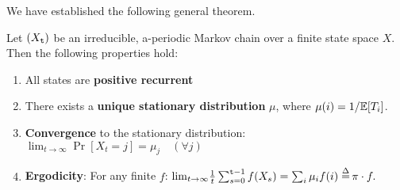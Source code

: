 We have established the following general theorem.

\begin{theorem}\label{thm:finite_Markov_chains}
Let $({X_{\tt t}})$ be an irreducible,  a-periodic Markov chain over
a finite state space $X$.  Then the following properties hold:
\begin{enumerate}
\item All states are \textbf{positive recurrent}
\item There exists a \textbf{unique stationary distribution}
${\mu}$, where $\mu(i)=1/\mathbb{E}[T_i]$.
\item \textbf{Convergence} to the stationary distribution: 
${\lim _{t \to \infty }}\Pr
[X_t=j] = {\mu_j}\quad (\forall j)$
\item \textbf{Ergodicity}: For any finite $f$: ${\lim _{t \to \infty }}\frac{1}{t}\sum\nolimits_{s = 0}^{\ttime - 1} {f({X_s}) = \sum\nolimits_i {\mu_i f(i) \buildrel \Delta \over = } } \,\pi  \cdot f.$
\end{enumerate}
\end{theorem}

%
%
%
%

